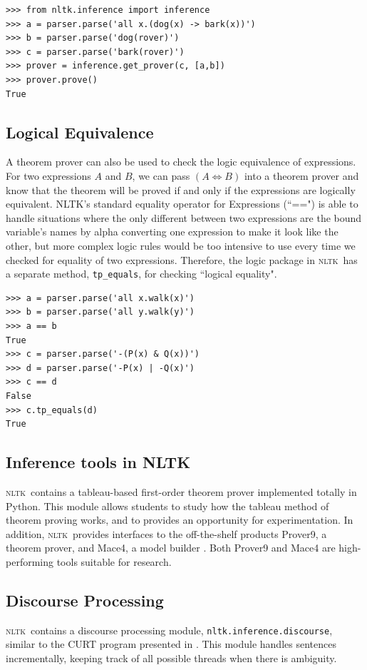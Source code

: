 \documentclass[11pt,a4paper]{article}
\newcommand{\NLTK}{\textsc{nltk}}
\newcommand{\dhgcode}[1]{{\tt #1}}
\begin{document}
\begin{verbatim}
>>> from nltk.inference import inference
>>> a = parser.parse('all x.(dog(x) -> bark(x))')
>>> b = parser.parse('dog(rover)')
>>> c = parser.parse('bark(rover)')
>>> prover = inference.get_prover(c, [a,b])
>>> prover.prove()
True
\end{verbatim}

\subsection{Logical Equivalence}
A theorem prover can also be used to check the logic equivalence of
expressions.  For two expressions $A$ and $B$, we can pass $(A\iff B)$
into a theorem prover and know that the theorem will be proved if and
only if the expressions are logically equivalent.  NLTK's standard
equality operator for Expressions (``==") is able to handle situations
where the only different between two expressions are the bound
variable's names by alpha converting one expression to make it look
like the other, but more complex logic rules would be too intensive to
use every time we checked for equality of two expressions.  Therefore,
the logic package in \NLTK\ has a separate method,
\dhgcode{tp\_equals}, for checking ``logical equality".

\begin{verbatim}
>>> a = parser.parse('all x.walk(x)')
>>> b = parser.parse('all y.walk(y)')
>>> a == b
True
>>> c = parser.parse('-(P(x) & Q(x))')
>>> d = parser.parse('-P(x) | -Q(x)')
>>> c == d
False
>>> c.tp_equals(d)
True
\end{verbatim}

\subsection{Inference tools in NLTK}
\NLTK\ contains a tableau-based first-order theorem prover implemented
totally in Python.  This module allows students to study how the
tableau method of theorem proving works, and to provides an
opportunity for experimentation.  In addition, \NLTK\ provides
interfaces to the off-the-shelf products Prover9, a theorem prover,
and Mace4, a model builder \cite{McCune}.  Both Prover9 and Mace4 are
high-performing tools suitable for research.

\subsection{Discourse Processing}
\NLTK\ contains a discourse processing module, \dhgcode{nltk.inference.discourse}, similar to the CURT program presented in \cite{BB}.  This module handles sentences incrementally, keeping track of all possible threads when there is ambiguity.  
\end{document}

